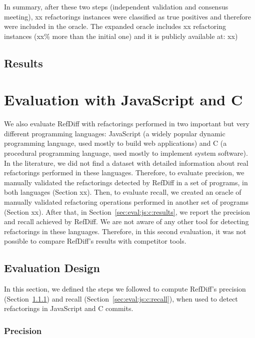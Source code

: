 In summary, after these two steps (independent validation and consensus meeting), xx refactorings instances were  classified as true positives and therefore were included in the oracle. The expanded oracle includes xx refactoring instances (xx\% more than the initial one) and it is publicly available at: xx)

\subsection{Results}
\label{sec:eval:java:results}

\section{Evaluation with JavaScript and C}
\label{sec:eval:js:c:reults}

We also evaluate RefDiff with refactorings performed in two important but very different programming languages: JavaScript (a widely popular dynamic programming language, used mostly to build web applications) and C (a procedural programming language, used mostly to implement system software).
In the literature, we did not find a dataset with detailed information about real refactorings performed in these languages. Therefore, to evaluate precision, we manually validated the refactorings detected by RefDiff in a set of programs, in both languages (Section xx). Then, to evaluate recall, we created an oracle of manually validated refactoring operations performed in another set of programs (Section xx).  After that, in Section~\ref{sec:eval:js:c:results}, we report the precision and recall achieved by RefDiff.  We are not aware of any other tool for detecting refactorings in these languages. Therefore, in this second evaluation, it was not possible to compare RefDiff's results with competitor tools.

\subsection{Evaluation Design}
\label{sec:eval:js:c:design}

In this section, we defined the steps we followed to compute RefDiff's precision (Section~\ref{sec:eval:js:c:precision})
and recall (Section~\ref{sec:eval:js:c:recall}), when used to detect refactorings in JavaScript and C commits.

\subsubsection{Precision}
\label{sec:eval:js:c:precision}



